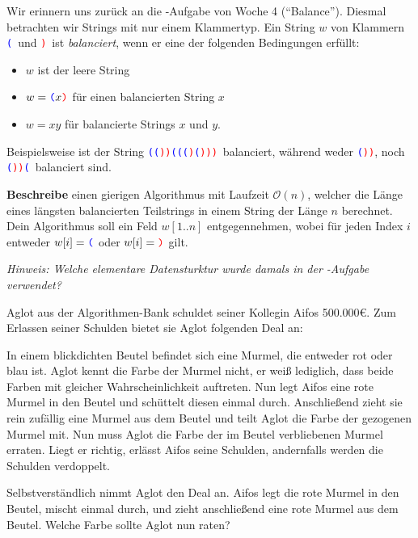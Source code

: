 \documentclass{uebung_cs}
\begin{document}
\begin{aufgabe}[Balance II]
    \newcommand{\obr}{\textcolor{blue}{\texttt (}}
    \newcommand{\cbr}{\textcolor{red}{\texttt )}}
    Wir erinnern uns zurück an die -Aufgabe von Woche 4 (``Balance'').
    Diesmal betrachten wir Strings mit nur einem Klammertyp.
    Ein String $w$ von Klammern \obr\ und \cbr\ ist \emph{balanciert}, wenn er eine der folgenden Bedingungen erfüllt:
    \begin{itemize}
        \item $w$ ist der leere String
        \item $w = \obr x \cbr$ für einen balancierten String $x$
        \item $w = xy$ für balancierte Strings $x$ und $y$.
    \end{itemize}
    Beispielsweise ist der String \obr \obr \cbr \cbr \obr \obr \obr \cbr \obr \cbr \cbr \cbr\ balanciert, während weder \obr \cbr \cbr, noch \obr \cbr \cbr \obr\ balanciert sind.

    \textbf{Beschreibe} einen gierigen Algorithmus mit Laufzeit $\mathcal O(n)$, welcher die Länge eines längsten balancierten Teilstrings in einem String der Länge $n$ berechnet.
    Dein Algorithmus soll ein Feld $w[1..n]$ entgegennehmen, wobei für jeden Index $i$ entweder $w[i] = \obr$ oder $w[i] = \cbr$ gilt.

    \emph{Hinweis: Welche elementare Datensturktur wurde damals in der -Aufgabe verwendet?}
\end{aufgabe}

\begin{aufgabe}[Schuldenerlass]
    Aglot aus der Algorithmen-Bank schuldet seiner Kollegin Aifos 500.000€. Zum Erlassen seiner Schulden bietet sie Aglot folgenden Deal an:

    In einem blickdichten Beutel befindet sich eine Murmel, die entweder rot oder blau ist.
    Aglot kennt die Farbe der Murmel nicht, er weiß lediglich, dass beide Farben mit gleicher Wahrscheinlichkeit auftreten.
    Nun legt Aifos eine rote Murmel in den Beutel und schüttelt diesen einmal durch.
    Anschließend zieht sie rein zufällig eine Murmel aus dem Beutel und teilt Aglot die Farbe der gezogenen Murmel mit.
    Nun muss Aglot die Farbe der im Beutel verbliebenen Murmel erraten.
    Liegt er richtig, erlässt Aifos seine Schulden, andernfalls werden die Schulden verdoppelt.

    Selbstverständlich nimmt Aglot den Deal an.
    Aifos legt die rote Murmel in den Beutel, mischt einmal durch, und zieht anschließend eine rote Murmel aus dem Beutel.
    Welche Farbe sollte Aglot nun raten?
\end{aufgabe}
\end{document}
